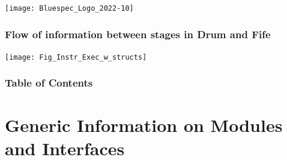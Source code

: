 



\date{L7: RISC-V: Modules and Interfaces}





\begin{frame}
 \titlepage

 \begin{center}
  \texttt{[image: Bluespec\_Logo\_2022-10]}
 \end{center}

\end{frame}





\begin{frame}
\frametitle{Flow of information between stages in Drum and Fife}

\footnotesize

\begin{center}
\texttt{[image: Fig\_Instr\_Exec\_w\_structs]}
\end{center}

\end{frame}


\begin{frame}
\frametitle{Table of Contents}

\tableofcontents

\end{frame}


\section{Generic Information on Modules and Interfaces}


